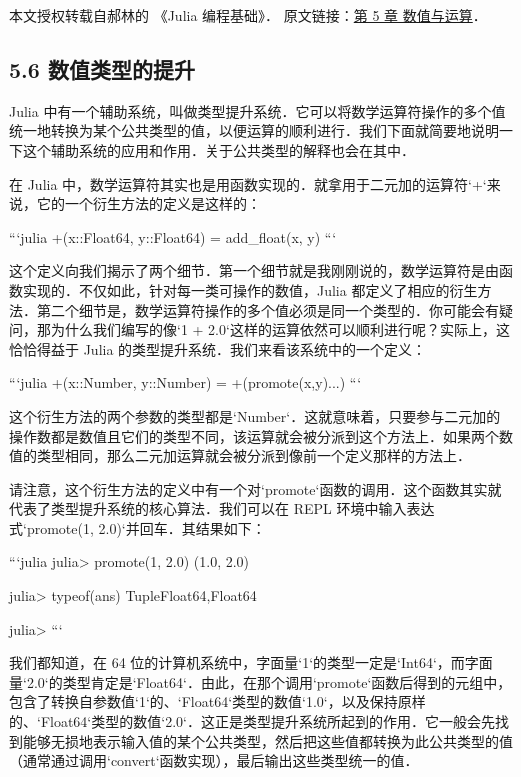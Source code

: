 
本文授权转载自郝林的 《Julia 编程基础》． 原文链接：\href{https://github.com/hyper0x/JuliaBasics/blob/master/book/ch05.md}{第 5 章 数值与运算}．


\subsection{5.6 数值类型的提升}

Julia 中有一个辅助系统，叫做类型提升系统．它可以将数学运算符操作的多个值统一地转换为某个公共类型的值，以便运算的顺利进行．我们下面就简要地说明一下这个辅助系统的应用和作用．关于公共类型的解释也会在其中．

在 Julia 中，数学运算符其实也是用函数实现的．就拿用于二元加的运算符`+`来说，它的一个衍生方法的定义是这样的：

```julia
+(x::Float64, y::Float64) = add_float(x, y)
```

这个定义向我们揭示了两个细节．第一个细节就是我刚刚说的，数学运算符是由函数实现的．不仅如此，针对每一类可操作的数值，Julia 都定义了相应的衍生方法．第二个细节是，数学运算符操作的多个值必须是同一个类型的．你可能会有疑问，那为什么我们编写的像`1 + 2.0`这样的运算依然可以顺利进行呢？实际上，这恰恰得益于 Julia 的类型提升系统．我们来看该系统中的一个定义：

```julia
+(x::Number, y::Number) = +(promote(x,y)...)
```

这个衍生方法的两个参数的类型都是`Number`．这就意味着，只要参与二元加的操作数都是数值且它们的类型不同，该运算就会被分派到这个方法上．如果两个数值的类型相同，那么二元加运算就会被分派到像前一个定义那样的方法上．

请注意，这个衍生方法的定义中有一个对`promote`函数的调用．这个函数其实就代表了类型提升系统的核心算法．我们可以在 REPL 环境中输入表达式`promote(1, 2.0)`并回车．其结果如下：

```julia
julia> promote(1, 2.0)
(1.0, 2.0)

julia> typeof(ans)
Tuple{Float64,Float64}

julia> 
```

我们都知道，在 64 位的计算机系统中，字面量`1`的类型一定是`Int64`，而字面量`2.0`的类型肯定是`Float64`．由此，在那个调用`promote`函数后得到的元组中，包含了转换自参数值`1`的、`Float64`类型的数值`1.0`，以及保持原样的、`Float64`类型的数值`2.0`．这正是类型提升系统所起到的作用．它一般会先找到能够无损地表示输入值的某个公共类型，然后把这些值都转换为此公共类型的值（通常通过调用`convert`函数实现），最后输出这些类型统一的值．

